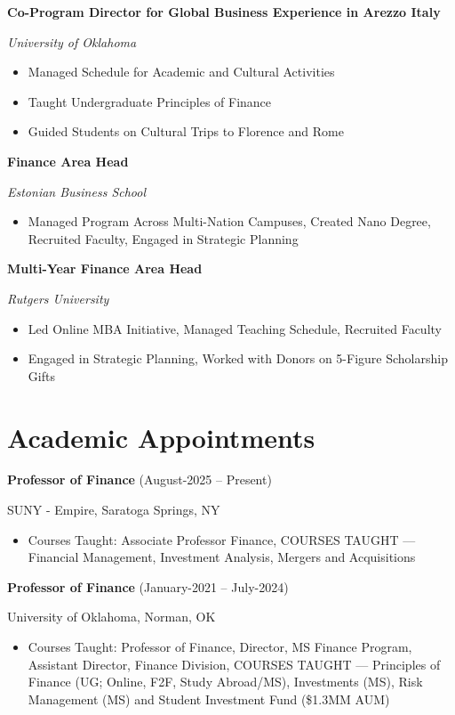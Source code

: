 \documentclass[11pt,a4paper,]{awesome-cv}
\begin{document}
\textbf{Co-Program Director for Global Business Experience in Arezzo Italy}

\textit{University of Oklahoma}

\begin{itemize}
\item Managed Schedule for Academic and Cultural Activities
\item Taught Undergraduate Principles of Finance
\item Guided Students on Cultural Trips to Florence and Rome
\end{itemize}

\textbf{Finance Area Head}

\textit{Estonian Business School}

\begin{itemize}
\item Managed Program Across Multi-Nation Campuses, Created Nano Degree, Recruited Faculty, Engaged in Strategic Planning
\end{itemize}

\textbf{Multi-Year Finance Area Head}

\textit{Rutgers University}

\begin{itemize}
\item Led Online MBA Initiative, Managed Teaching Schedule, Recruited Faculty
\item Engaged in Strategic Planning, Worked with Donors on 5-Figure Scholarship Gifts
\end{itemize}

\section{Academic Appointments}\label{academic-appointments}

\textbf{Professor of Finance} (August-2025 -- Present)

SUNY - Empire, Saratoga Springs, NY

\begin{itemize}
\item Courses Taught:  Associate Professor Finance, COURSES TAUGHT --- Financial Management, Investment Analysis, Mergers and Acquisitions
\end{itemize}

\textbf{Professor of Finance} (January-2021 -- July-2024)

University of Oklahoma, Norman, OK

\begin{itemize}
\item Courses Taught:  Professor of Finance, Director, MS Finance Program, Assistant Director, Finance Division, COURSES TAUGHT --- Principles of Finance (UG; Online, F2F, Study Abroad/MS), Investments (MS), Risk Management (MS) and Student Investment Fund (\$1.3MM AUM)
\end{itemize}
\end{document}
